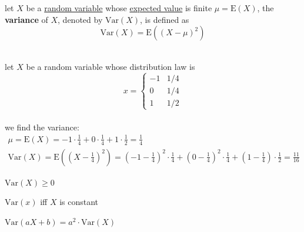 \documentclass[a4paper,12pt]{article}
\newcommand{\?}{\stackrel{?}{=}}
\begin{document}
\newenvironment{note}
  {\begin{bclogo}[logo=\bcinfo, couleurBarre=orange, couleur=lightgray]{ note}}
  {\end{bclogo}}
\newenvironment{attention}
  {\begin{bclogo}[logo=\bcattention, couleurBarre=red, noborder=true, 
                couleur=red!15]{Important!}}
  {\end{bclogo}}

\begin{definition}
let \(X\) be a \href{20230104221353-random_variable.org}{random variable} whose \href{20230121184721-expected_value.org}{expected value} is finite \(\mu=\mathrm{E}(X)\), the \textbf{variance} of \(X\), denoted by \(\mathrm{Var}(X)\), is defined as\\[0pt]
\[
\mathrm{Var}(X) = \mathrm{E}\left(\left(X-\mu\right)^2\right)
\]\\[0pt]
\begin{my_example}
let \(X\) be a random variable whose distribution law is\\[0pt]
\[
x = \begin{cases}
      -1 & 1/4\\
      0 & 1/4\\
      1 & 1/2
    \end{cases}
\]\\[0pt]
we find the variance:\\[0pt]
\begin{gather*}
\mu = \mathrm{E}(X) = -1 \cdot \frac{1}{4} + 0 \cdot \frac{1}{4} + 1 \cdot \frac{1}{2} = \frac{1}{4}\\
\mathrm{Var}(X) = \mathrm{E}\left(\left(X-\frac{1}{4}\right)^2\right) = \left(-1-\frac{1}{4}\right)^2 \cdot \frac{1}{4} + \left(0-\frac{1}{4}\right)^2 \cdot \frac{1}{4} + \left(1-\frac{1}{4}\right) \cdot \frac{1}{2} = \frac{11}{16}
\end{gather*}
\end{my_example}
\begin{characteristic}
\(\mathrm{Var}(X) \geq 0\)\\[0pt]
\end{characteristic}
\begin{characteristic}
\(\mathrm{Var}(x)\) iff \(X\) is constant\\[0pt]
\end{characteristic}
\begin{characteristic}
\(\mathrm{Var}(aX+b)=a^2 \cdot \mathrm{Var}(X)\)\\[0pt]
\end{characteristic}
\end{definition}
\end{document}
